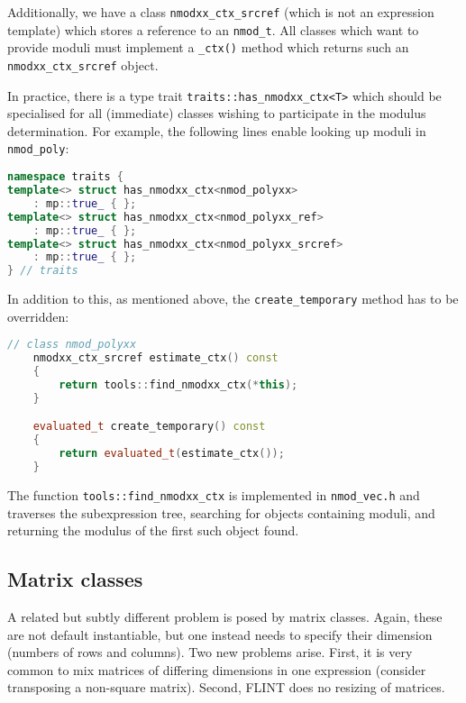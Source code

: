 \documentclass[a4paper,10pt]{book}
\newcommand{\code}{\lstinline}
\begin{document}
{{Additionally, we have a class \code{nmodxx_ctx_srcref} (which is not an
expression template) which stores a reference to an \code{nmod_t}. All classes
which want to provide moduli must implement a \code{_ctx()} method which returns
such an \code{nmodxx_ctx_srcref} object.

In practice, there is a type trait \code{traits::has_nmodxx_ctx<T>} which should
be specialised for all (immediate) classes wishing to participate in the modulus
determination. For example, the following lines enable looking up moduli in
\code{nmod_poly}:

\begin{lstlisting}[language=c++]
namespace traits {
template<> struct has_nmodxx_ctx<nmod_polyxx>
    : mp::true_ { };
template<> struct has_nmodxx_ctx<nmod_polyxx_ref>
    : mp::true_ { };
template<> struct has_nmodxx_ctx<nmod_polyxx_srcref>
    : mp::true_ { };
} // traits
\end{lstlisting}

In addition to this, as mentioned above, the \code{create_temporary} method has
to be overridden:

\begin{lstlisting}[language=c++]
// class nmod_polyxx
    nmodxx_ctx_srcref estimate_ctx() const
    {
        return tools::find_nmodxx_ctx(*this);
    }

    evaluated_t create_temporary() const
    {
        return evaluated_t(estimate_ctx());
    }
\end{lstlisting}

The function \code{tools::find_nmodxx_ctx} is implemented in \code{nmod_vec.h}
and traverses the subexpression tree, searching for objects containing moduli,
and returning the modulus of the first such object found.


\subsection{Matrix classes}

A related but subtly different problem is posed by matrix classes. Again, these
are not default instantiable, but one instead needs to specify their dimension
(numbers of rows and columns). Two new problems arise. First, it is very common
to mix matrices of differing dimensions in one expression (consider transposing
a non-square matrix). Second, FLINT does no resizing of matrices.

}}
\end{document}

